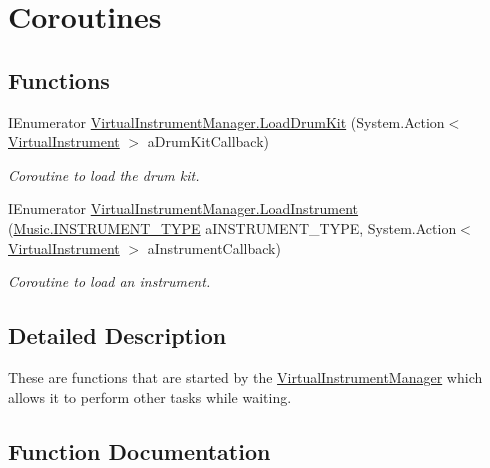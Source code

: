 \hypertarget{group___v_i_m_coroutines}{}\section{Coroutines}
\label{group___v_i_m_coroutines}
\subsection*{Functions}
\begin{DoxyCompactItemize}
\item 
I\+Enumerator \hyperlink{group___v_i_m_coroutines_gaba165ca4757b6c8555914fe6b42b638d}{Virtual\+Instrument\+Manager.\+Load\+Drum\+Kit} (System.\+Action$<$ \hyperlink{class_virtual_instrument}{Virtual\+Instrument} $>$ a\+Drum\+Kit\+Callback)
\begin{DoxyCompactList}\small\item\em Coroutine to load the drum kit. \end{DoxyCompactList}\item 
I\+Enumerator \hyperlink{group___v_i_m_coroutines_gab8082c1cc590771bf57da8b5ae8603d1}{Virtual\+Instrument\+Manager.\+Load\+Instrument} (\hyperlink{group___music_enums_gabfce60192305965558a36e368ebd67c3}{Music.\+I\+N\+S\+T\+R\+U\+M\+E\+N\+T\+\_\+\+T\+Y\+PE} a\+I\+N\+S\+T\+R\+U\+M\+E\+N\+T\+\_\+\+T\+Y\+PE, System.\+Action$<$ \hyperlink{class_virtual_instrument}{Virtual\+Instrument} $>$ a\+Instrument\+Callback)
\begin{DoxyCompactList}\small\item\em Coroutine to load an instrument. \end{DoxyCompactList}\end{DoxyCompactItemize}


\subsection{Detailed Description}
These are functions that are started by the \hyperlink{class_virtual_instrument_manager}{Virtual\+Instrument\+Manager} which allows it to perform other tasks while waiting. 

\subsection{Function Documentation}
\mbox{\label{group___v_i_m_coroutines_gaba165ca4757b6c8555914fe6b42b638d}} 
